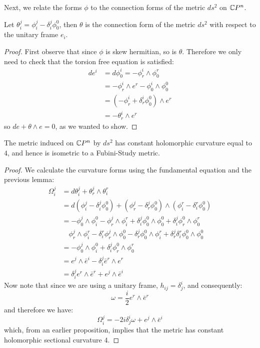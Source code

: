 Next, we relate the forms $\phi$ to the connection forms of the metric $ds^2$ on $\mathbb{C}P^n$.
%
\begin{lem}  Let $ \theta^j_i = \phi^j_i - \delta^j_i \phi^0_0 $, then $\theta$ is the connection form of the metric $ds^2$ with respect to the unitary frame $e_i$.
\end{lem}
%
\begin{proof}  First observe that since $\phi$ is skew hermitian, so is $\theta$.  Therefore we only need to check that the torsion free equation is satisfied:
%
\begin{align*}
d e^i &= d \phi^i_0 = - \phi^i_r \wedge \phi^r_0 \\
&= - \phi^i_r \wedge e^r - \phi^i_0 \wedge \phi^0_0 \\
&= ( - \phi^i_r + \delta^i_r \phi^0_0 ) \wedge e^r \\
&= - \theta^i_r \wedge e^r
\end{align*} 
%
so $d e + \theta \wedge e = 0$, as we wanted to show.
%
\end{proof}
%
\begin{prop} The metric induced on $\mathbb{C}P^n$ by $ds^2$ has constant holomorphic curvature equal to $4$, and hence is isometric to a Fubini-Study metric.
\end{prop}
%
\begin{proof}
%
We calculate the curvature forms using the fundamental equation and the previous lemma:
%
\begin{align*}
\Omega^j_i &= d \theta^j_i + \theta^j_r \wedge \theta^r_i \\
&= d( \phi^j_i - \delta^j_i \phi^0_0 ) + ( \phi^j_r - \delta^j_r \phi^0_0 ) \wedge ( \phi^r_i - \delta^r_i \phi^0_0 ) \\
%
&= - \phi^j_0 \wedge \phi^0_i - \phi^j_r \wedge \phi^r_i + \delta^j_i \phi^0_0 \wedge \phi^0_0 + \delta^j_i \phi^0_r \wedge \phi^r_0 \\
& \quad \phi^j_r \wedge \phi^r_i - \delta^r_i \phi^j_r \wedge \phi^0_0 - \delta^j_r \phi^0_0 \wedge \phi^r_i + \delta^j_r \delta^r_i \phi^0_0 \wedge \phi^0_0 \\
%
&= - \phi^j_0 \wedge \phi^0_i + \delta^j_i \phi^0_r \wedge \phi^r_0 \\
&= e^j \wedge \bar{e}^i - \delta^j_i \bar{e}^r \wedge e^r \\
&= \delta^j_i e^r \wedge \bar{e}^r + e^j \wedge \bar{e}^i 
\end{align*}
%
Now note that since we are using a unitary frame, $h_{ij} = \delta^i_j$, and consequently:
%
$$ \omega = \frac{i}{2} e^r \wedge \bar{e}^r $$
%
and therefore we have:
%
$$ \Omega^j_i = - 2 i \delta^i_j \omega + e^j \wedge \bar{e}^i $$
%
which, from an earlier proposition, implies that the metric has constant holomorphic sectional curvature $4$.
\end{proof}

